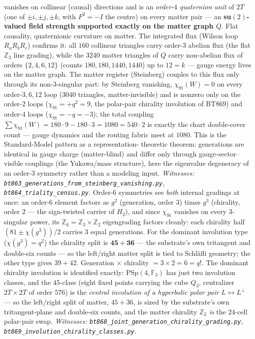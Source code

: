 \documentclass[11pt]{article}
\newcommand{\GF}[1]{\mathbb{F}_{#1}}
\newcommand{\PSp}{\mathrm{PSp}}
\begin{document}
vanishes on collinear (causal) directions and is an \emph{order-$4$
quaternion unit} of $2T$ (one of $\pm i,\pm j,\pm k$, with $F^2=-I$
the centre) on every matter pair --- an \textbf{su$(2)$-valued field
strength supported exactly on the matter graph $Q$}.  Flat causality,
quaternionic curvature on matter.  The integrated flux (Wilson loop
$R_aR_bR_c$) confirms it: all $160$ collinear triangles carry order-$3$
abelian flux (the flat $\mathbb{Z}_3$ line grading), while the $3240$
matter triangles of $Q$ carry non-abelian flux of orders
$\{2,4,6,12\}$ (counts $180,180,1440,1440$) up to $12=k$ --- gauge
energy lives on the matter graph.  The matter register (Steinberg)
couples to this flux only through its non-$3$-singular part: by
Steinberg vanishing, $\chi_{\mathrm{St}}(W)=0$ on every order-$3,6,12$
loop ($3040$ triangles, matter-invisible) and is nonzero only on the
order-$2$ loops ($\chi_{\mathrm{St}}=+q^2=9$, the polar-pair
chirality involution of BT869) and order-$4$ loops
($\chi_{\mathrm{St}}=-q=-3$); the total coupling
$\sum\chi_{\mathrm{St}}(W)=180\cdot9-180\cdot3=1080=540\cdot2$ is
exactly the chart double-cover count --- gauge dynamics and the
routing fabric meet at $1080$.
This is the Standard-Model
pattern as a representation-
theoretic theorem: generations are identical in gauge charge
(matter-blind) and differ only through gauge-sector--visible
couplings (the Yukawa/mass structure), here the eigenvalue
degeneracy of an order-$3$ symmetry rather than a modeling input.
\emph{Witnesses: \texttt{bt863\_generations\_from\_steinberg\_vanishing.py},
\texttt{bt864\_triality\_census.py}.}
Order-$6$ symmetries see \emph{both} internal gradings at once: an
order-$6$ element factors as $g^2$ (generation, order $3$) times
$g^3$ (chirality, order $2$ --- the sign-twisted carrier of
$H_2$), and since $\chi_{\mathrm{St}}$ vanishes on every $3$-singular
power, its $\mathbb{Z}_6=\mathbb{Z}_3\times\mathbb{Z}_2$ eigengrading
factors cleanly: each chirality half $(81\pm\chi(g^3))/2$ carries $3$
equal generations.  For the dominant involution type
($\chi(g^3)=q^2$) the chirality split is $\mathbf{45+36}$ --- the
substrate's own tritangent and double-six counts --- so the
left/right matter split is tied to Schl\"afli geometry; the other
type gives $39+42$.  Generation $\times$ chirality $=3\times2=6=q!$.
The dominant chirality involution is identified exactly:
$\PSp(4,\GF3)$ has just two involution classes, and the $45$-class
(eight fixed points carrying the cube $Q_3$, centralizer
$2T\times2T$ of order $576$) is the \emph{central involution of a
hyperbolic polar pair} $L\leftrightarrow L^\perp$ --- so the
left/right split of matter, $45+36$, is sized by the substrate's own
tritangent-plane and double-six counts, and the matter chirality
$\mathbb{Z}_2$ \emph{is} the $24$-cell polar-pair swap.
\emph{Witnesses:
\texttt{bt868\_joint\_generation\_chirality\_grading.py},
\texttt{bt869\_involution\_chirality\_classes.py}.}
\end{document}
